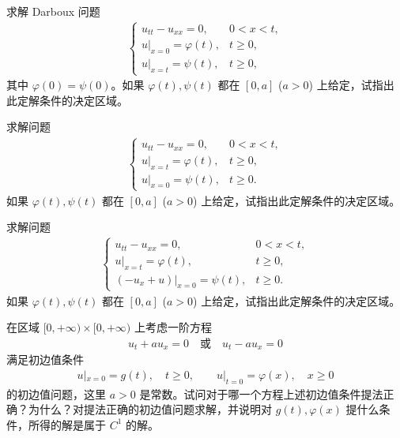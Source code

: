 \documentclass[../../main.tex]{subfiles}%
\begin{document}
\begin{example}
求解 Darboux 问题
\begin{align*}
\begin{cases}
u_{tt}-u_{xx}=0, & 0<x<t, \\
u|_{x=0}=\varphi(t), & t\geqslant 0, \\
u|_{x=t}=\psi(t), & t\geqslant 0,
\end{cases}
\end{align*}
其中 $\varphi(0)=\psi(0)$。如果 $\varphi(t),\psi(t)$ 都在 $[0,a]$ ($a>0$) 上给定，试指出此定解条件的决定区域。
\end{example}

\begin{example}
求解问题
\begin{align*}
\begin{cases}
u_{tt}-u_{xx}=0, & 0<x<t, \\
u|_{x=t}=\varphi(t), & t\geqslant 0, \\
u|_{x=0}=\psi(t), & t\geqslant 0.
\end{cases}
\end{align*}
如果 $\varphi(t),\psi(t)$ 都在 $[0,a]$ ($a>0$) 上给定，试指出此定解条件的决定区域。
\end{example}

\begin{example}
求解问题
\begin{align*}
\begin{cases}
u_{tt}-u_{xx}=0, & 0<x<t, \\
u|_{x=t}=\varphi(t), & t\geqslant 0, \\
(-u_x+u)|_{x=0}=\psi(t), & t\geqslant 0.
\end{cases}
\end{align*}
如果 $\varphi(t),\psi(t)$ 都在 $[0,a]$ ($a>0$) 上给定，试指出此定解条件的决定区域。
\end{example}

\begin{example}
在区域 $[0,+\infty)\times[0,+\infty)$ 上考虑一阶方程
\begin{align*}
u_t+au_x=0 \quad\text{或}\quad u_t-au_x=0
\end{align*}
满足初边值条件
\begin{align*}
u|_{x=0}=g(t),\quad t\geqslant 0,\qquad u|_{t=0}=\varphi(x),\quad x\geqslant 0
\end{align*}
的初边值问题，这里 $a>0$ 是常数。试问对于哪一个方程上述初边值条件提法正确？为什么？对提法正确的初边值问题求解，并说明对 $g(t),\varphi(x)$ 提什么条件，所得的解是属于 $C^1$ 的解。
\end{example}
\end{document}
